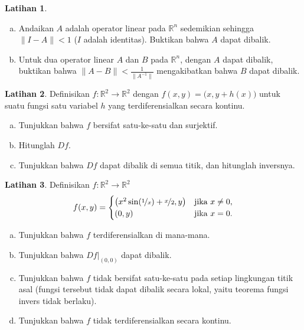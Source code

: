 \documentclass[12pt,openany]{book}
\newcommand{\snorm}[1]{\lVert {#1} \rVert}
\newcommand{\R}{{\mathbb{R}}}
\theoremstyle{plain}
\theoremstyle{remark}
\theoremstyle{definition}
\newenvironment{exbox}{%
    \def\FrameCommand{\vrule width 1pt \relax\hspace{10pt}}%
    \MakeFramed{\advance\hsize-\width\FrameRestore}%
}{%
    \endMakeFramed
}
\newenvironment{exparts}{%
    \leavevmode\begin{enumerate}[a),noitemsep,topsep=0pt,parsep=0pt,partopsep=0pt]
}{%
    \end{enumerate}
}
\theoremstyle{exercise}
\newtheorem{exercise}{Latihan}[section]
\theoremstyle{example}
\begin{document}
\begin{exbox}
\begin{exercise}
\begin{exparts}
\item
Andaikan $A$ adalah operator linear pada $\R^n$ sedemikian sehingga
$\snorm{I-A} < 1$ ($I$ adalah identitas). Buktikan bahwa $A$ dapat dibalik.
\item
Untuk dua operator linear $A$ dan $B$ pada $\R^n$, dengan $A$ dapat dibalik,
buktikan bahwa $\snorm{A-B} < \frac{1}{\snorm{A^{-1}}}$ mengakibatkan bahwa $B$
dapat dibalik.
\end{exparts}
\end{exercise}

\begin{exercise}
Definisikan $f \colon \R^2 \to \R^2$ dengan $f(x,y) =
\bigl(x,y+h(x)\bigr)$ untuk suatu fungsi satu variabel $h$ yang terdiferensialkan
secara kontinu.
\begin{exparts}
\item
Tunjukkan bahwa $f$ bersifat satu-ke-satu dan surjektif.
\item
Hitunglah $Df$.
\item
Tunjukkan bahwa $Df$ dapat dibalik di semua titik, dan hitunglah
inversnya.
\end{exparts}
\end{exercise}

\begin{exercise}
Definisikan $f \colon \R^2 \to \R^2$
\begin{equation*}
f(x,y) =
\begin{cases}
\bigl(x^2 \sin (\nicefrac{1}{x}) + \nicefrac{x}{2} , y \bigr) &
\text{jika } x \neq 0, \\
(0,y) &
\text{jika } x=0.
\end{cases}
\end{equation*}
\begin{exparts}
\item
Tunjukkan bahwa $f$ terdiferensialkan di mana-mana.
\item
Tunjukkan bahwa $Df|_{(0,0)}$ dapat dibalik.
\item
Tunjukkan bahwa $f$ tidak bersifat satu-ke-satu pada setiap lingkungan titik asal (fungsi tersebut
tidak dapat dibalik secara lokal, yaitu teorema fungsi invers tidak berlaku).
\item
Tunjukkan bahwa $f$ tidak terdiferensialkan secara kontinu.
\end{exparts}
\end{exercise}


\end{exbox}
\end{document}
